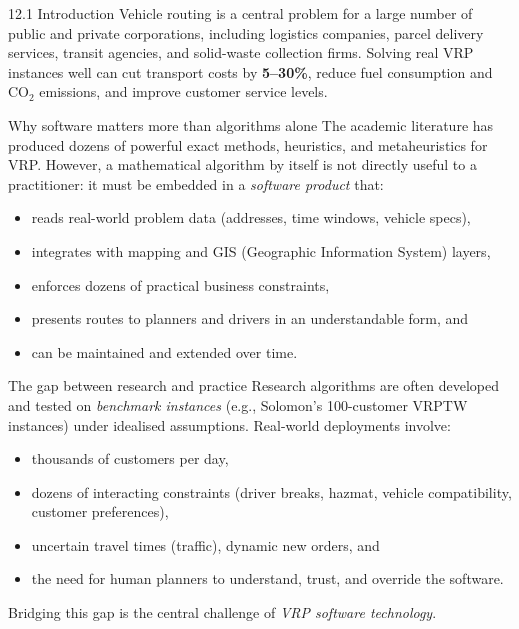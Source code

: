 \documentclass[aspectratio=169,10pt]{beamer}
\begin{document}
\begin{frame}[allowframebreaks]{12.1 \; Introduction}
  Vehicle routing is a central problem for a large number of public and private
  corporations, including logistics companies, parcel delivery services, transit
  agencies, and solid-waste collection firms.
  Solving real VRP instances well can cut transport costs by \textbf{5--30\%},
  reduce fuel consumption and CO$_2$ emissions, and improve customer service levels.

  \begin{block}{Why software matters more than algorithms alone}
    The academic literature has produced dozens of powerful exact methods,
    heuristics, and metaheuristics for VRP.
    However, a mathematical algorithm by itself is not directly useful to a
    practitioner: it must be embedded in a \emph{software product} that:
    \begin{itemize}
      \item reads real-world problem data (addresses, time windows, vehicle specs),
      \item integrates with mapping and GIS (Geographic Information System) layers,
      \item enforces dozens of practical business constraints,
      \item presents routes to planners and drivers in an understandable form, and
      \item can be maintained and extended over time.
    \end{itemize}
  \end{block}

  \framebreak

  \begin{alertblock}{The gap between research and practice}
    Research algorithms are often developed and tested on \emph{benchmark instances}
    (e.g., Solomon's 100-customer VRPTW instances) under idealised assumptions.
    Real-world deployments involve:
    \begin{itemize}
      \item thousands of customers per day,
      \item dozens of interacting constraints (driver breaks, hazmat, vehicle
            compatibility, customer preferences),
      \item uncertain travel times (traffic), dynamic new orders, and
      \item the need for human planners to understand, trust, and override
            the software.
    \end{itemize}
    Bridging this gap is the central challenge of \emph{VRP software technology}.
  \end{alertblock}


\end{frame}
\end{document}
